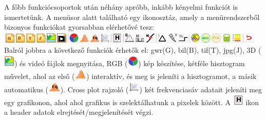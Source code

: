 \documentclass[a4paper,12pt]{book}
\begin{document}
A főbb funkciócsoportok után néhány apróbb, inkább kényelmi funkciót is ismertetünk. A menüsor alatt található egy ikonosztáz, amely a menürendszerből bizonyos funkciókat gyorsabban elérhetővé tesz:\\
\includegraphics[height=0.55cm]{ikonosztaz.png} \\Balról jobbra a következő funkciók érhetők el: gwr(G), bil(B), tif(T), jpg(J), 3D (\includegraphics[height=0.55cm]{3dikon.png}) és videó fájlok megnyitása, RGB (\includegraphics[height=0.55cm]{rgbikon}) kép készítése, kétféle hisztogram művelet, ahol az első (\includegraphics[height=0.55cm]{histo1ikon}) interaktív, és meg is jeleníti a hisztogramot, a másik automatikus (\includegraphics[height=0.55cm]{histo2ikon}). Cross plot rajzoló (\includegraphics[height=0.55cm]{cpikon}) két frekvenciasáv adatait jeleníti meg egy grafikonon, ahol ahol grafikus is szelektálhatunk a pixelek között. A \includegraphics[height=0.55cm]{headerikon} ikon a header adatok elrejtését/megjelenítését végzi. 
\end{document}
